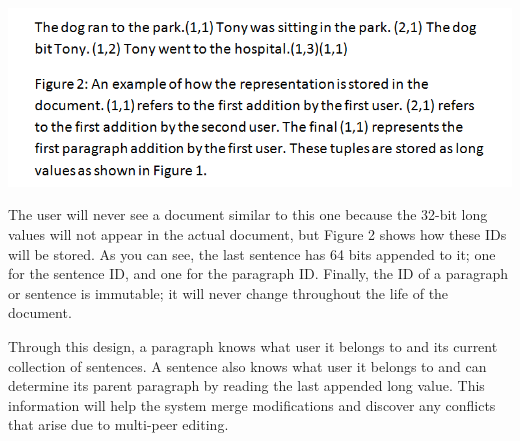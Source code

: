 \includegraphics[scale=0.55]{figure2.png}

The user will never see a document similar to this one because the 32-bit long values will not appear in the actual document, but Figure 2 shows how these IDs will be stored. As you can see, the last sentence has 64 bits appended to it; one for the sentence ID, and one for the paragraph ID.  Finally, the ID of a paragraph or sentence is immutable; it will never change throughout the life of the document.

Through this design, a paragraph knows what user it belongs to and its current collection of sentences. A sentence also knows what user it belongs to and can determine its parent paragraph by reading the last appended long value. This information will help the system merge modifications and discover any conflicts that arise due to multi-peer editing.
